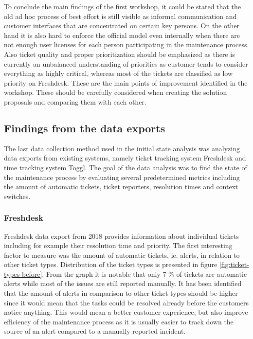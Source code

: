 \vspace{12pt}


To conclude the main findings of the first workshop, it could be stated that the old ad hoc process of best effort is still visible as informal communication and customer interfaces that are
concentrated on certain key persons. On the other hand it is also hard to enforce the official model even internally when there are not enough user licenses for each person participating
in the maintenance process. Also ticket quality and proper prioritization should be emphasized as there is currently an unbalanced understanding of priorities as customer tends to consider
everything as highly critical, whereas most of the tickets are classified as low priority on Freshdesk. These are the main points of improvement identified in the workshop.
These should be carefully considered when creating the solution proposals and comparing them with each other.

\subsection{Findings from the data exports}

The last data collection method used in the initial state analysis was analyzing data exports from existing systems, namely ticket tracking system Freshdesk and time tracking system Toggl.
The goal of the data analysis was to find the state of the maintenance process by evaluating several predetermined metrics including the amount of automatic tickets, ticket reporters,
resolution times and context switches.

\subsubsection*{Freshdesk}

Freshdesk data export from 2018 provides information about individual tickets including for example their resolution time and priority. The first interesting factor to measure was the amount
of automatic tickets, ie. alerts, in relation to other ticket types. Distribution of the ticket types is presented in figure \ref{fig:ticket-types-before}. From the graph it is notable that
only 7 \% of tickets are automatic alerts while most of the issues are still reported manually. It has been identified that the amount of alerts in comparison to other ticket types
should be higher since it would mean that the tasks could be resolved already before the customers notice anything. This would mean a better customer experience, but also improve efficiency
of the maintenance process as it is usually easier to track down the source of an alert compared to a manually reported incident.

